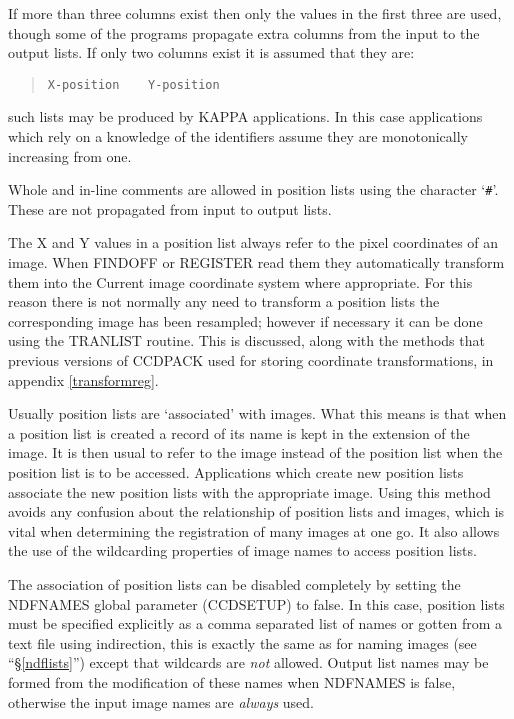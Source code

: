 \documentclass[twoside,11pt]{article}
\newcommand{\hyperref}[4]{#2\ref{#4}#3}
\newcommand{\htmlref}[2]{#1}
\newcommand{\xref}[3]{#1}
\renewcommand{\_}{\texttt{\symbol{95}}}
\newenvironment{myquote}{\begin{quote}\begin{small}}{\end{small}\end{quote}}
\newcommand{\routine}[1]{{\sc #1}}
\newcommand{\xroutine}[1]{\htmlref{{\sc #1}}{#1}}
\begin{document}
If more than three columns exist then only the values in the first 
three are used, though some of the programs propagate extra columns
from the input to the output lists.
If only two columns exist it is assumed that they are:
\begin{myquote}
\begin{verbatim}
X-position    Y-position
\end{verbatim}
\end{myquote}
such lists may be produced by \xref{KAPPA}{sun95}{} applications. In
this case applications which rely on a knowledge of the identifiers
assume they are monotonically increasing from one.

Whole and in-line comments are allowed in position lists using the
character `{\tt \#}'.  These are not propagated from input to output lists.

The X and Y values in a position list always refer to the 
pixel coordinates of an image.
When \routine{FINDOFF} or \routine{REGISTER} read them they
automatically transform them into the Current image coordinate system
where appropriate.
For this reason there is not normally any need to transform a position
lists the corresponding image has been resampled; 
however if necessary it can be done using the
\xroutine{TRANLIST} routine.  This is discussed, along with the
methods that previous versions of CCDPACK used 
for storing coordinate transformations,
in appendix \ref{transformreg}.

Usually position lists are `associated' with images. What this means is
that when a position list is created a record of its name is kept in the
extension of the image. It is then usual to refer to the image instead of
the position list when the position list is to be accessed. Applications
which create new position lists associate the new position lists with
the appropriate image. Using this method avoids any confusion about the
relationship of position lists and images, which is vital when determining
the registration of many images at one go. It also allows the use of the
wildcarding properties of image names to access position lists.

The association of position lists can be disabled completely by setting
the NDFNAMES global parameter
(\xroutine{CCDSETUP}) to false. In this case, position lists must be specified
explicitly as a comma separated list of names or gotten from a text
file using indirection, this is exactly the same as for naming images
(see ``\hyperref{processing lists of data}{\S}{}{ndflists}'') except that
wildcards are {\em not} allowed. Output list names may be formed
from the modification of these names when NDFNAMES is false, otherwise
the input image names are {\em always} used.
\end{document}
